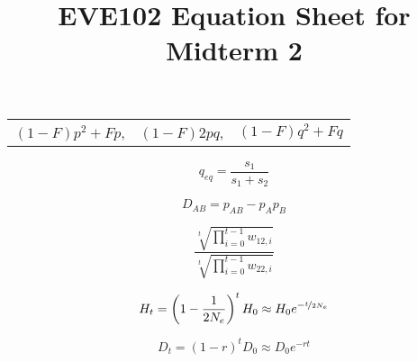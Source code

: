 \documentclass[12pt,twocolumn]{article}
\begin{document}
\title{EVE102 Equation Sheet for Midterm 2}
\date{}
\maketitle

\begin{center}
\begin{tabular}{ccc}
$(1-F) p^2 + F p$, & $(1-F) 2pq$, & $(1-F) q^2 + F q$ \nonumber
\end{tabular}
\end{center}

\begin{equation}
q_{eq} = \frac{s_1}{s_1+s_2}
\end{equation}

\begin{equation}
D_{AB} = p_{AB} - p_Ap_B \nonumber
\end{equation}

\begin{equation}
	\frac{\sqrt[t]{\prod_{i=0}^{t-1}w_{12,i}}}{\sqrt[t]{\prod_{i=0}^{t-1}w_{22,i}}} \nonumber
\end{equation}

\begin{equation}
  H_t = \left(1-\frac{1}{2N_e} \right)^tH_0 \approx H_0 e^{-\nicefrac{t}{2N_e}} \nonumber
\end{equation}

\begin{equation}
  D_t=  (1-r)^t D_0 \approx D_0 e^{-rt} \nonumber
\end{equation}
\end{document}
